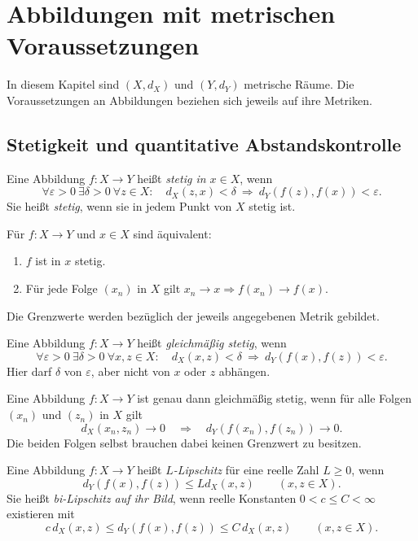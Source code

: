 \chapter{Abbildungen mit metrischen Voraussetzungen}
\label{b47guide:ch:maps}

In diesem Kapitel sind $(X,d_X)$ und $(Y,d_Y)$ metrische Räume.
Die Voraussetzungen an Abbildungen beziehen sich jeweils auf ihre Metriken.

\section{Stetigkeit und quantitative Abstandskontrolle}

\begin{definition}
\label{b47guide:def:continuity}
Eine Abbildung $f:X\to Y$ heißt \emph{stetig in $x\in X$}, wenn
\[
 \forall\varepsilon>0\ \exists\delta>0\ \forall z\in X:
 \quad d_X(z,x)<\delta\ \Longrightarrow\ d_Y(f(z),f(x))<\varepsilon.
\]
Sie heißt \emph{stetig}, wenn sie in jedem Punkt von $X$ stetig ist.
\end{definition}

\begin{theorem}
\label{b47guide:thm:sequence-continuity}
Für $f:X\to Y$ und $x\in X$ sind äquivalent:
\begin{enumerate}
\item $f$ ist in $x$ stetig.
\item Für jede Folge $(x_n)$ in $X$ gilt
      $x_n\to x\Longrightarrow f(x_n)\to f(x)$.
\end{enumerate}
Die Grenzwerte werden bezüglich der jeweils angegebenen Metrik gebildet.
\cite{metric-notes}
\end{theorem}

\begin{definition}
\label{b47guide:def:uniform-continuity}
Eine Abbildung $f:X\to Y$ heißt \emph{gleichmäßig stetig}, wenn
\[
 \forall\varepsilon>0\ \exists\delta>0\ \forall x,z\in X:
 \quad d_X(x,z)<\delta\ \Longrightarrow\ d_Y(f(x),f(z))<\varepsilon.
\]
Hier darf $\delta$ von $\varepsilon$, aber nicht von $x$ oder $z$ abhängen.
\end{definition}

\begin{theorem}
\label{b47guide:thm:uniform-sequences}
Eine Abbildung $f:X\to Y$ ist genau dann gleichmäßig stetig, wenn für
alle Folgen $(x_n)$ und $(z_n)$ in $X$ gilt
\[
 d_X(x_n,z_n)\to0\quad\Longrightarrow\quad
 d_Y(f(x_n),f(z_n))\to0.
\]
Die beiden Folgen selbst brauchen dabei keinen Grenzwert zu besitzen.
\end{theorem}
\begin{definition}
\label{b47guide:def:lipschitz}
Eine Abbildung $f:X\to Y$ heißt \emph{$L$-Lipschitz} für eine reelle
Zahl $L\geq0$, wenn
\[
 d_Y(f(x),f(z))\leq Ld_X(x,z)\qquad(x,z\in X).
\]
Sie heißt \emph{bi-Lipschitz auf ihr Bild}, wenn reelle Konstanten
$0<c\leq C<\infty$ existieren mit
\[
 c\,d_X(x,z)\leq d_Y(f(x),f(z))\leq C\,d_X(x,z)
 \qquad(x,z\in X).
\]
\end{definition}

